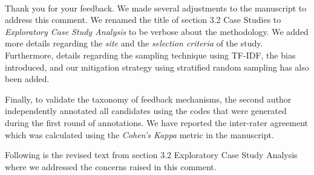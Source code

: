 \documentclass[11pt,fleqn]{article}
\newcommand{\eline}{\vspace*{.75\baselineskip}}
\newcommand{\Us}{\eline \noindent {\bf Response:}\\}
\begin{document}
\Us Thank you for your feedback. We made several adjustments to the manuscript to address this comment. We renamed the title of section 3.2 Case Studies to \emph{Exploratory Case Study Analysis} to be verbose about the methodology. We added more details regarding the \emph{site} and the \emph{selection criteria} of the study. Furthermore, details regarding the sampling technique using TF-IDF, the bias introduced, and our mitigation strategy using stratified random sampling has also been added.

Finally, to validate the taxonomy of feedback mechanisms, the second author independently annotated all candidates using the codes that were generated during the first round of annotations. We have reported the inter-rater agreement which was calculated using the \emph{Cohen's Kappa} metric in the manuscript.

Following is the revised text from section 3.2 Exploratory Case Study Analysis where we addressed the concerns raised in this comment.
\end{document}

